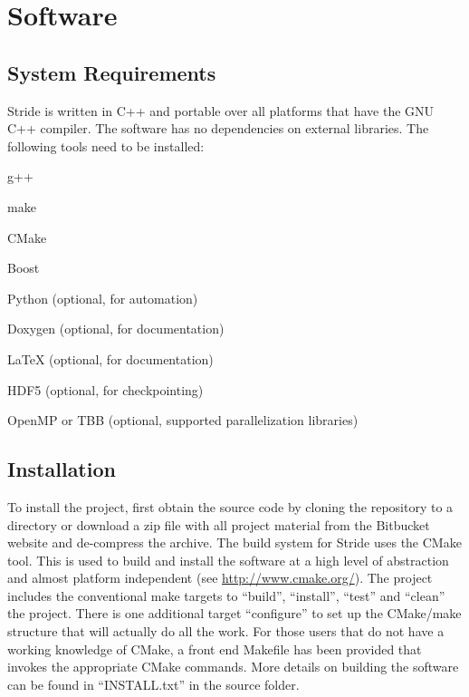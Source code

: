 \chapter{Software}
\label{chap:software}


\section{System Requirements}
\label{section:system}

Stride is written in C++ and portable over all platforms that have the GNU C++ compiler. 
The software has no dependencies on external libraries. The following tools need to be installed:
\begin{compactitem}
    \item g++
    \item make
    \item CMake
    \item Boost
    \item Python (optional, for automation)
    \item Doxygen (optional, for documentation)
    \item LaTeX (optional, for documentation)
    \item HDF5 (optional, for checkpointing)
    \item OpenMP or TBB (optional, supported parallelization libraries)
\end{compactitem}


\section{Installation}
\label{section:Installation}

To install the project, first obtain the source code by cloning the repository to a directory or download a zip file with all project
material from the Bitbucket website and de-compress the archive. 
The build system for Stride uses the CMake tool. This is used to build and install the software at a high level of abstraction and almost platform independent (see \url{http://www.cmake.org/}). 
The project includes the conventional make targets to ``build'', ``install'', ``test'' and ``clean'' the project. There is one additional target ``configure'' to set up the CMake/make structure that will actually do all the work.
For those users that do not have a working knowledge of CMake, a front end Makefile has been provided that invokes the appropriate CMake commands.
More details on building the software can be found in ``INSTALL.txt'' in the source folder.


